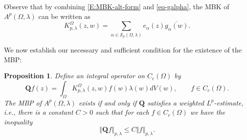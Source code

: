 \documentclass[letterpaper,11pt,reqno]{amsart}
\theoremstyle{plain}
\newtheorem{proposition}[equation]{Proposition}
\theoremstyle{definition}
\theoremstyle{remark}
\theoremstyle{remark}
\numberwithin{equation}{section}
\newcommand{\norm}[1]{\left\Vert#1\right\Vert}
\newcommand{\ol}{\overline}
\newcommand{\cs}{{\mathcal S}}
\begin{document}
Observe that by combining \eqref{E:MBK-alt-form} and \eqref{eq-galpha}, the MBK of $A^p(\Omega, \lambda)$ can be written as 
\begin{equation}\label{eq-kgalpha}
K_{p,\lambda}^\Omega(z,w)=\sum_{\alpha\in \cs_p(\Omega, \lambda)}e_\alpha(z) \ol{g_\alpha(w)}. 
\end{equation}

We now establish our necessary and sufficient condition for the existence of the MBP:
\begin{proposition}\label{prop:MBP-is-a-basis-projection}
Define an integral operator on $C_c(\Omega)$ by
\begin{equation}\label{eq-qdef}
\bm{Q}f(z) = \int_\Omega  K_{p,\lambda}^\Omega(z,w) f(w)\lambda(w) dV(w), \qquad f\in C_c(\Omega).
\end{equation}
The MBP of $A^p(\Omega,\lambda)$ exists if and only if $\bm{Q}$ satisfies a weighted $L^p$-estimate, i.e., there is a constant $C>0$ such that for each $f\in C_c(\Omega)$ we have the inequality
\begin{equation}\label{eq-lpest}
\norm{\bm{Q} f}_{p,\lambda}\leq C \norm{f}_{p,\lambda}.
\end{equation}
\end{proposition}
\end{document}
